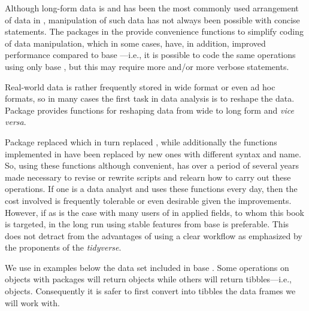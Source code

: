\documentclass[krantz2]{krantz}\usepackage{knitr}
\begin{document}
Although long-form data is and has been the most commonly used arrangement of data in \Rlang, manipulation of such data has not always been possible with concise \Rlang statements. The packages in the  provide convenience functions to simplify coding of data manipulation, which in some cases, have, in addition, improved performance compared to base \Rlang---i.e., it is possible to code the same operations using only base \Rlang, but this may require more and/or more verbose statements.

Real-world data is rather frequently stored in wide format or even ad hoc formats, so in many cases the first task in data analysis is to reshape the data. Package  provides functions for reshaping data from wide to long form and \emph{vice versa}.

\begin{warningbox}
Package  replaced  which in turn replaced , while additionally the functions implemented in  have been replaced by new ones with different syntax and name. So, using these functions although convenient, has over a period of several years made necessary to revise or rewrite scripts and relearn how to carry out these operations. If one is a data analyst and uses these functions every day, then the cost involved is frequently tolerable or even desirable given the improvements. However, if as is the case with many users of \Rlang in applied fields, to whom this book is targeted, in the long run using stable features from base \Rlang is preferable. This does not detract from the advantages of using a clear workflow as emphasized by the proponents of the \emph{tidyverse}.
\end{warningbox}

We use in examples below the  data set included in base \Rlang. Some operations on \Rlang {} objects with  packages will return  objects while others will return tibbles---i.e.,  objects. Consequently it is safer to first convert into tibbles the data frames we will work with.

\begin{knitrout}\footnotesize
{}\color{fgcolor}\begin{kframe}
\begin{alltt}
 \hlkwb{<-} 
\end{alltt}
\end{kframe}
\end{knitrout}
\end{document}

